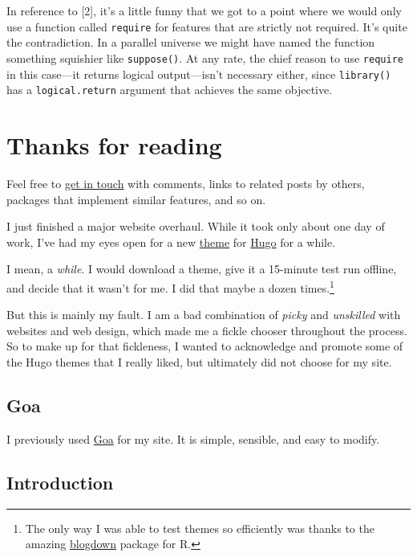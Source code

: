 \documentclass[]{article}
\let\rmarkdownfootnote\footnote%
\def\footnote{\protect\rmarkdownfootnote}
\theoremstyle{definition}
\theoremstyle{definition}
\theoremstyle{definition}
\theoremstyle{remark}
\begin{document}
In reference to {[}2{]}, it's a little funny that we got to a point
where we would only use a function called \texttt{require} for features
that are strictly not required. It's quite the contradiction. In a
parallel universe we might have named the function something squishier
like \texttt{suppose()}. At any rate, the chief reason to use
\texttt{require} in this case---it returns logical output---isn't
necessary either, since \texttt{library()} has a \texttt{logical.return}
argument that achieves the same objective.

\hypertarget{thanks-for-reading}{%
\section{Thanks for reading}\label{thanks-for-reading}}

Feel free to \href{https://www.twitter.com/mikedecr}{get in touch} with
comments, links to related posts by others, packages that implement
similar features, and so on.

I just finished a major website overhaul. While it took only about one
day of work, I've had my eyes open for a new
\href{https://themes.gohugo.io/}{theme} for
\href{https://gohugo.io/}{Hugo} for a while.

I mean, a \emph{while}. I would download a theme, give it a 15-minute
test run offline, and decide that it wasn't for me. I did that maybe a
dozen times.\footnote{The only way I was able to test themes so
  efficiently was thanks to the amazing
  \href{https://bookdown.org/yihui/blogdown/}{blogdown} package for R.}

But this is mainly my fault. I am a bad combination of \emph{picky} and
\emph{unskilled} with websites and web design, which made me a fickle
chooser throughout the process. So to make up for that fickleness, I
wanted to acknowledge and promote some of the Hugo themes that I really
liked, but ultimately did not choose for my site.

\hypertarget{goa}{%
\subsection{Goa}\label{goa}}

I previously used \href{https://themes.gohugo.io/hugo-goa}{Goa} for my
site. It is simple, sensible, and easy to modify.

\hypertarget{introduction}{%
\subsection{Introduction}\label{introduction}}
\end{document}

